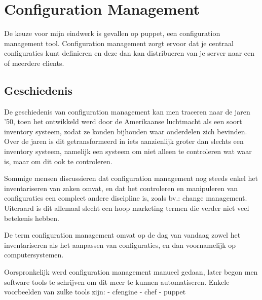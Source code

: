 \chapter{Configuration Management}

De keuze voor mijn eindwerk is gevallen op puppet, een configuration management tool. Configuration management zorgt ervoor dat je centraal configuraties kunt definieren en deze dan kan distribueren van je server naar een of meerdere clients.


\section{Geschiedenis}

De geschiedenis van configuration management kan men traceren naar de jaren '50, toen het ontwikkeld werd door de Amerikaanse luchtmacht als een soort inventory systeem, zodat ze konden bijhouden waar onderdelen zich bevinden.
Over de jaren is dit getransformeerd in iets aanzienlijk groter dan slechts een inventory systeem,
namelijk een systeem om niet alleen te controleren wat waar is, maar om dit ook te controleren.

Sommige mensen discussieren dat configuration management nog steeds enkel het inventariseren van zaken omvat,
en dat het controleren en manipuleren van configuraties een compleet andere discipline is, zoals bv.: change management.
Uiteraard is dit allemaal slecht een hoop marketing termen die verder niet veel betekenis hebben.

De term configuration management omvat op de dag van vandaag zowel het inventariseren als het aanpassen van configuraties, en dan  voornamelijk op computersystemen.

Oorspronkelijk werd configuration management manueel gedaan, later begon men software tools te schrijven om dit meer te kunnen automatiseren.
Enkele voorbeelden van zulke tools zijn:
	- cfengine
	- chef
	- puppet
